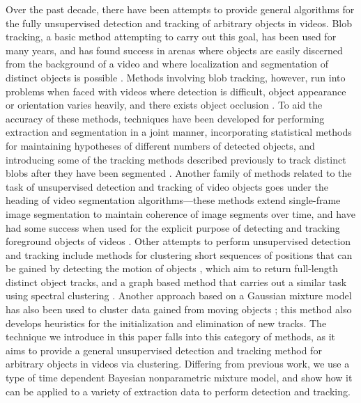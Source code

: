 \documentclass[smallcondensed, final]{svjour3}
\begin{document}
Over the past decade, there have been attempts to provide general algorithms for the fully unsupervised detection and tracking of arbitrary objects in videos. Blob tracking, a basic method attempting to carry out this goal, has been used for many years, and has found success in arenas where objects are easily discerned from the background of a video and where localization and segmentation of distinct objects is possible \cite{francois2004real, isard_2001}. Methods involving blob tracking, however, run into problems when faced with videos where detection is difficult, object appearance or orientation varies heavily, and there exists object occlusion \cite{song2005model}. To aid the accuracy of these methods, techniques have been developed for performing extraction and segmentation in a joint manner, incorporating statistical methods for maintaining hypotheses of different numbers of detected objects, and introducing some of the tracking methods described previously to track distinct blobs after they have been segmented \cite{collins2003mean, isard_2001}. Another family of methods related to the task of unsupervised detection and tracking of video objects goes under the heading of video segmentation algorithms---these methods extend single-frame image segmentation to maintain coherence of image segments over time, and have had some success when used for the explicit purpose of detecting and tracking foreground objects of videos \cite{brox2003unsupervised, sista2000unsupervised, wang1998unsupervised}. Other attempts to perform unsupervised detection and tracking include methods for clustering short sequences of positions that can be gained by detecting the motion of objects \cite{brostow2006unsupervised, brox2010object}, which aim to return full-length distinct object tracks, and a graph based method that carries out a similar task using spectral clustering \cite{fragkiadaki2011detection}. Another approach based on a Gaussian mixture model has also been used to cluster data gained from moving objects \cite{pece_2002}; this method also develops heuristics for the initialization and elimination of new tracks. The technique we introduce in this paper falls into this category of methods, as it aims to provide a general unsupervised detection and tracking method for arbitrary objects in videos via clustering. Differing from previous work, we use a type of time dependent Bayesian nonparametric mixture model, and show how it can be applied to a variety of extraction data to perform detection and tracking.
\end{document}
